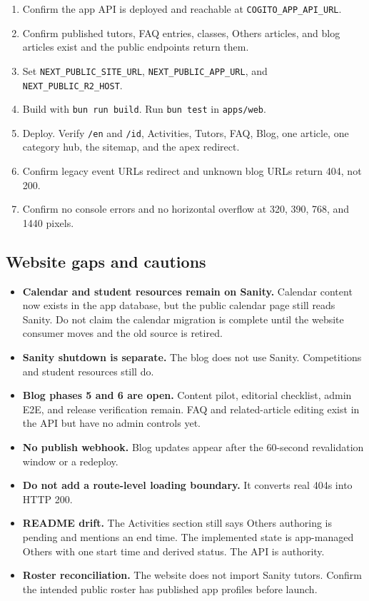 \documentclass[11pt,a4paper]{article}
\newcommand{\code}[1]{\texttt{#1}}
\begin{document}
\begin{enumerate}
	\item Confirm the app API is deployed and reachable at \code{COGITO\_APP\_API\_URL}.
	\item Confirm published tutors, FAQ entries, classes, Others articles, and blog articles exist and the public endpoints return them.
	\item Set \code{NEXT\_PUBLIC\_SITE\_URL}, \code{NEXT\_PUBLIC\_APP\_URL}, and \code{NEXT\_PUBLIC\_R2\_HOST}.
	\item Build with \code{bun run build}. Run \code{bun test} in \code{apps/web}.
	\item Deploy. Verify \code{/en} and \code{/id}, Activities, Tutors, FAQ, Blog, one article, one category hub, the sitemap, and the apex redirect.
	\item Confirm legacy event URLs redirect and unknown blog URLs return 404, not 200.
	\item Confirm no console errors and no horizontal overflow at 320, 390, 768, and 1440 pixels.
\end{enumerate}

\subsection{Website gaps and cautions}

\begin{itemize}
	\item \textbf{Calendar and student resources remain on Sanity.} Calendar content now exists in the app database, but the public calendar page still reads Sanity. Do not claim the calendar migration is complete until the website consumer moves and the old source is retired.
	\item \textbf{Sanity shutdown is separate.} The blog does not use Sanity. Competitions and student resources still do.
	\item \textbf{Blog phases 5 and 6 are open.} Content pilot, editorial checklist, admin E2E, and release verification remain. FAQ and related-article editing exist in the API but have no admin controls yet.
	\item \textbf{No publish webhook.} Blog updates appear after the 60-second revalidation window or a redeploy.
	\item \textbf{Do not add a route-level loading boundary.} It converts real 404s into HTTP 200.
	\item \textbf{README drift.} The Activities section still says Others authoring is pending and mentions an end time. The implemented state is app-managed Others with one start time and derived status. The API is authority.
	\item \textbf{Roster reconciliation.} The website does not import Sanity tutors. Confirm the intended public roster has published app profiles before launch.
\end{itemize}
\end{document}
